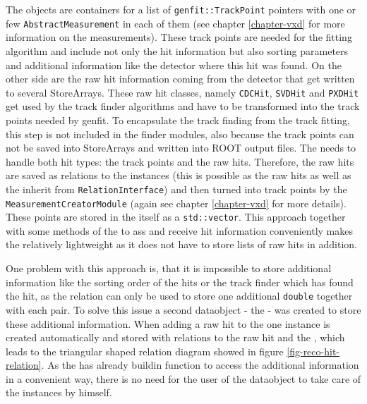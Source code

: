 The \Track objects are containers for a list of \texttt{genfit::TrackPoint} pointers with one or few \texttt{AbstractMeasurement} in each of them (see chapter \ref{chapter-vxd} for more information on the measurements). These track points are needed for the fitting algorithm and include not only the hit information but also sorting parameters and additional information like the detector where this hit was found. On the other side are the raw hit information coming from the detector that get written to several StoreArrays. These raw hit classes, namely \texttt{CDCHit}, \texttt{SVDHit} and \texttt{PXDHit} get used by the track finder algorithms and have to be transformed into the track points needed by genfit. To encapsulate the track finding from the track fitting, this step is not included in the finder modules, also because the track points can not be saved into StoreArrays and written into ROOT output files. The \RecoTrack needs to handle both hit types: the track points and the raw hits. Therefore, the raw hits are saved as relations to the \RecoTrack instances (this is possible as the raw hits as well as the \RecoTrack inherit from \texttt{RelationInterface}) and then turned into track points by the \texttt{MeasurementCreatorModule} (again see chapter \ref{chapter-vxd} for more details). These points are stored in the \RecoTrack itself as a \texttt{std::vector}. This approach together with some methods of the \RecoTrack to ass and receive hit information conveniently makes the \RecoTrack relatively lightweight as it does not have to store lists of raw hits in addition.

One problem with this approach is, that it is impossible to store additional information like the sorting order of the hits or the track finder which has found the hit, as the relation can only be used to store one additional \texttt{double} together with each pair. To solve this issue a second dataobject - the \Hit - was created to store these additional information. When adding a raw hit to the \RecoTrack one \Hit instance is created automatically and stored with relations to the raw hit and the \RecoTrack, which leads to the triangular shaped relation diagram showed in figure \ref{fig-reco-hit-relation}. As the \RecoTrack has already buildin function to access the additional information in a convenient way, there is no need for the user of the dataobject to take care of the \Hit instances by himself. 

